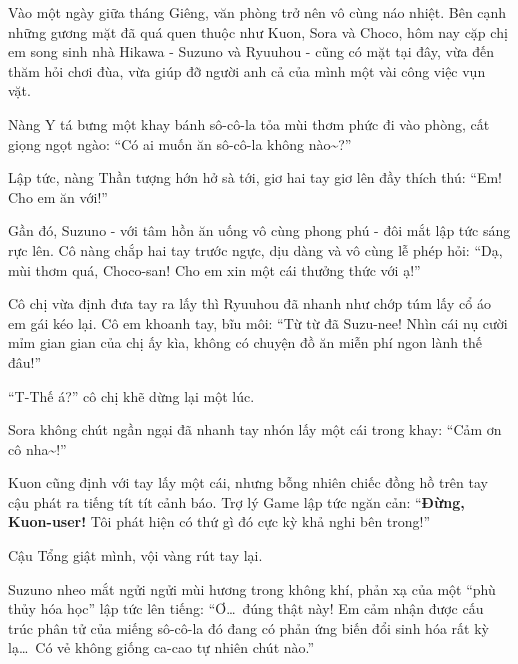 \documentclass[../main.tex]{subfiles}
\begin{document}

Vào một ngày giữa tháng Giêng, văn phòng \hll trở nên vô cùng náo nhiệt. Bên cạnh những gương mặt đã quá quen thuộc như Kuon, Sora và Choco, hôm nay cặp chị em song sinh nhà Hikawa - Suzuno và Ryuuhou - cũng có mặt tại đây, vừa đến thăm hỏi chơi đùa, vừa giúp đỡ người anh cả của mình một vài công việc vụn vặt.

Nàng Y tá bưng một khay bánh sô-cô-la tỏa mùi thơm phức đi vào phòng, cất giọng ngọt ngào: ``Có ai muốn ăn sô-cô-la không nào\~{}?''


Lập tức, nàng Thần tượng hớn hở sà tới, giơ hai tay giơ lên đầy thích thú: ``Em! Cho em ăn với!''

Gần đó, Suzuno - với tâm hồn ăn uống vô cùng phong phú - đôi mắt lập tức sáng rực lên. Cô nàng chắp hai tay trước ngực, dịu dàng và vô cùng lễ phép hỏi: ``Dạ, mùi thơm quá, Choco-san! Cho em xin một cái thưởng thức với ạ!''

Cô chị vừa định đưa tay ra lấy thì Ryuuhou đã nhanh như chớp túm lấy cổ áo em gái kéo lại. Cô em khoanh tay, bĩu môi: ``Từ từ đã Suzu-nee! Nhìn cái nụ cười mỉm gian gian của chị ấy kìa, không có chuyện đồ ăn miễn phí ngon lành thế đâu!''

``T-Thế á?'' cô chị khẽ dừng lại một lúc.

Sora không chút ngần ngại đã nhanh tay nhón lấy một cái trong khay: ``Cảm ơn cô nha\~{}!''

Kuon cũng định với tay lấy một cái, nhưng bỗng nhiên chiếc đồng hồ trên tay cậu phát ra tiếng tít tít cảnh báo. Trợ lý Game lập tức ngăn cản: ``\textbf{Đừng, Kuon-user!} Tôi phát hiện có thứ gì đó cực kỳ khả nghi bên trong!''

Cậu Tổng giật mình, vội vàng rút tay lại.

Suzuno nheo mắt ngửi ngửi mùi hương trong không khí, phản xạ của một ``phù thủy hóa học'' lập tức lên tiếng: ``Ơ\dots\ đúng thật này! Em cảm nhận được cấu trúc phân tử của miếng sô-cô-la đó đang có phản ứng biến đổi sinh hóa rất kỳ lạ\dots\ Có vẻ không giống ca-cao tự nhiên chút nào.''
\end{document}
